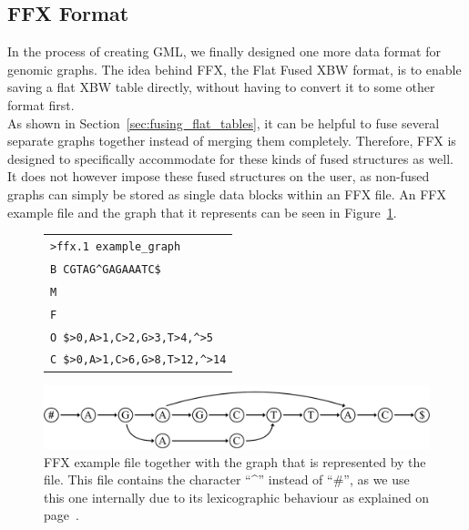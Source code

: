 \documentclass[a4paper,12pt,twoside,BCOR=10mm]{scrbook}
\begin{document}
\subsection{FFX Format}

In the process of creating GML, we finally designed one more data format for
genomic graphs. The idea behind FFX, the Flat Fused XBW format, is to enable saving
a flat XBW table directly, without having to convert it to some other format
first. \\
As shown in Section~\ref{sec:fusing_flat_tables},
it can be helpful to fuse several separate graphs together
instead of merging them completely. Therefore, FFX is designed
to specifically accommodate for these kinds of fused structures as well.
It does not however impose these fused structures on the user,
as non-fused graphs can simply be stored as single data blocks within
an FFX file.
An FFX example file and the graph that it represents can be seen in Figure~\ref{fig:evo_fig_ffx_example}.

\begin{figure}[!htb]
\centering
\begin{tabularx}{1.0\textwidth}{ | X | }
\hline
\texttt{>ffx.1 example\_graph} \\
\texttt{B \quad CGTAG{\textasciicircum}GAGAAATC\$} \\
\texttt{M \quad 111111111001111} \\
\texttt{F \quad 111011111011111} \\
\texttt{O \quad \$>0,A>1,C>2,G>3,T>4,{\textasciicircum}>5} \\
\texttt{C \quad \$>0,A>1,C>6,G>8,T>12,{\textasciicircum}>14} \\
\hline
\end{tabularx}
\includegraphics[width=\textwidth]{evo_fig_ffx_example.pdf}
\caption[FFX example file]{FFX example file together with the graph that is represented by the file. This file contains the character “{\textasciicircum}” instead of “$\#$”, as we use this one internally due to its lexicographic behaviour as explained on page~\pageref{hat_instead_of_hashtag}.} \label{fig:evo_fig_ffx_example}
\end{figure}
\end{document}
